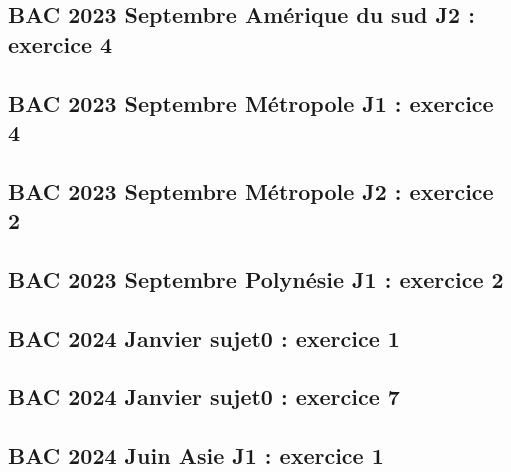 \documentclass[lang=fr,edition=teacher,layout=sheet]{mxbook}
\begin{document}
\begingroup\endgroup
\par\bigskip
{}\subsection*{BAC 2023 Septembre Amérique du sud J2 : exercice 4}
\begingroup\endgroup
\par\bigskip
{}\subsection*{BAC 2023 Septembre Métropole J1 : exercice 4}
\begingroup\endgroup
\par\bigskip
{}\subsection*{BAC 2023 Septembre Métropole J2 : exercice 2}
\begingroup\endgroup
\par\bigskip
{}\subsection*{BAC 2023 Septembre Polynésie J1 : exercice 2}
\begingroup\endgroup
\par\bigskip
{}\subsection*{BAC 2024 Janvier sujet0 : exercice 1}
\begingroup\endgroup
\par\bigskip
{}\subsection*{BAC 2024 Janvier sujet0 : exercice 7}
\begingroup\endgroup
\par\bigskip
{}\subsection*{BAC 2024 Juin Asie J1 : exercice 1}
\end{document}
